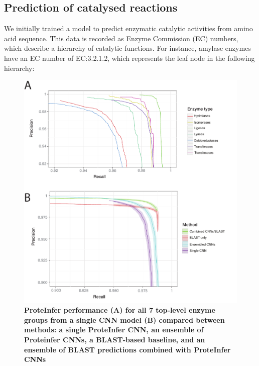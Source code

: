 \subsection*{Prediction of catalysed reactions}
We initially trained a model to predict enzymatic catalytic activities from amino acid sequence. This data is recorded as Enzyme Commission (EC) numbers, which describe a hierarchy of catalytic functions. For instance, \textbeta{} amylase enzymes have an EC number of EC:3.2.1.2, which represents the leaf node in the following hierarchy:
\renewcommand\DTstyle{\rmfamily}
\setlength{\DTbaselineskip}{15pt}
\medskip
{}
\medskip
\begin{figure}
\centering
  \includegraphics[width=\columnwidth]{fig3}%
  \caption{\textbf{ProteInfer performance (A) for all 7 top-level enzyme groups from a single CNN model (B) compared between methods: a single ProteInfer CNN, an ensemble of Proteinfer CNNs, a BLAST-based baseline, and an ensemble of BLAST predictions combined with ProteInfer CNNs }}
  \label{fig:toplevel}
\end{figure}

